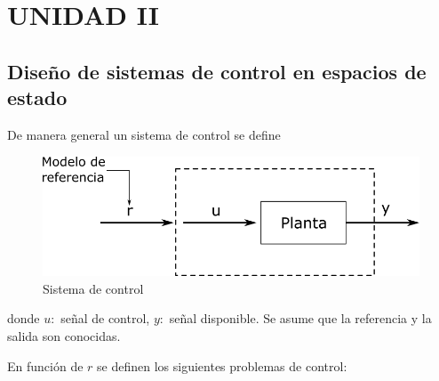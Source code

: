 \section{UNIDAD II}
\subsection{Diseño de sistemas de control en espacios de estado}

De manera general un sistema de control se define
\begin{figure}[h!]
    \centering
        \includegraphics[scale=0.25]{Control de Sistemas Mecatronicos Figuras/03 Sistema de Control.png}
        \caption{Sistema de control}
\end{figure}

donde \( u: \) señal de control, \( y: \) señal disponible. Se asume que la referencia y la salida son conocidas.

En función de \( r \) se definen los siguientes problemas de control:

